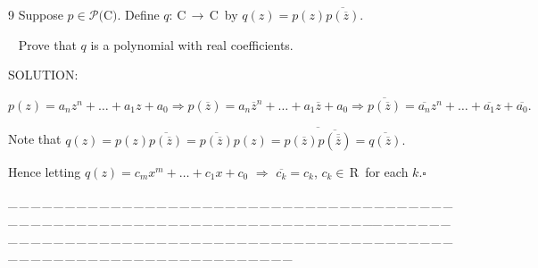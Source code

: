 \documentclass[a4paper, 11pt, UTF8]{article}
\def\Po{\mathcal{P}}
\def\Cbf{$\,{\timesbf C}\,$}
\def\Rbfc{$\,{\timesbf R}$}
\def\Cbfc{$\,{\timesbf C}$}
\begin{document}
\begin{large}
{\timesbf\Large 9} {\timessl\Large 
Suppose $p\in\Po(${\timesbf C}$)$. Define $q:\Cbf\rightarrow\Cbfc\,$ by $q(z) = p(z)\overline{p(\overline z)}$.}\par\,\,\,
{\timessl\Large Prove that $q$ is a polynomial with real coefficients.
}\par
{\timesbf S\footnotesize{OLUTION:}}\par\quad
$p(z)=a_n z^n+\dots+a_1 z+a_0\Rightarrow p(\overline z)=a_n \overline z^n+\dots+a_1 \overline z+a_0\Rightarrow \overline{p(\overline z)}=\overline{a_n}z^n+\dots+\overline{a_1}z+\overline{a_0}.$\par\quad
Note that $q(z)=p(z)\overline{p(\overline z)}=\overline{p(\overline z)}p(z)=\overline{p(\overline z)\overline{p(\overline{\overline z})}}=\overline{q(\overline z)}.$\par\quad
Hence letting $q(z)=c_m x^m+\dots+c_1 x+c_0\,\,\Rightarrow\,\,\overline{c_k}=c_k$, $c_k\in\Rbfc\,$ for each $k$.\quad$\square$\par
{\tiny \_\,\_\,\_\,\_\,\_\,\_\,\_\,\_\,\_\,\_\,\_\,\_\,\_\,\_\,\_\,\_\,\_\,\_\,\_\,\_\,\_\,\_\,\_\,\_\,\_\,\_\,\_\,\_\,\_\,\_\,\_\,\_\,\_\,\_\,\_\,\_\,\_\,\_\,\_\,\_\,\_\,\_\,\_\,\_\,\_\,\_\,\_\,\_\,\_\,\_\,\_\,\_\,\_\,\_\,\_\,\_\,\_\,\_\,\_\,\_\,\_\,\_\,\_\,\_\,\_\,\_\,\_\,\_\,\_\,\_\,\_\_\,\_\,\_\,\_\,\_\,\_\,\_\,\_\,\_\,\_\,\_\,\_\,\_\,\_\,\_\,\_\,\_\,\_\,\_\,\_\,\_\,\_\,\_\,\_\,\_\,\_\,\_\,\_\,\_\,\_\,\_\,\_\,\_\,\_\,\_\,\_\,\_\,\_\,\_\,\_\,\_\,\_\,\_\,\_\,\_\,\_\,\_\,\_\,\_\,\_\,\_\,\_\,\_\,\_\,\_\,\_\,\_\,\_\,\_\,\_\,\_\,\_\,\_\,\_\,\_\,\_\,\_\,\_\,\_\,\_\,\_}\par


\end{large}
\end{document}
